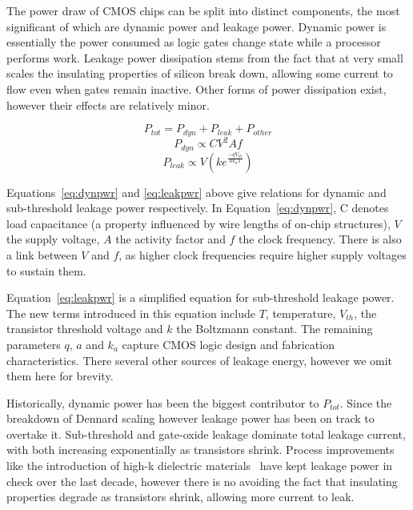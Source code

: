 The power draw of CMOS chips can be split into distinct components, the most significant of which are dynamic power and leakage power. Dynamic power is essentially the power consumed as logic gates change state while a processor performs work. Leakage power dissipation stems from the fact that at very small scales the insulating properties of silicon break down, allowing some current to flow even when gates remain inactive. Other forms of power dissipation exist, however their effects are relatively minor. \golden

\begin{equation}
\label{eq:totpwr}
P_{tot} = P_{dyn} + P_{leak} + P_{other}
\end{equation}
\begin{equation} 
\label{eq:dynpwr}
P_{dyn} \propto CV^{2}Af
\end{equation}
\begin{equation}
\label{eq:leakpwr}
P_{leak} \propto V\left(ke^{\frac{-qV_{th}}{ak_{a}T}}\right)
\end{equation}

Equations~\ref{eq:dynpwr} and \ref{eq:leakpwr} above give relations for dynamic and sub-threshold leakage power respectively. In Equation~\ref{eq:dynpwr}, C denotes load capacitance (a property influenced by wire lengths of on-chip structures), $V$ the supply voltage, $A$ the activity factor and $f$ the clock frequency. There is also a link between $V$ and $f$, as higher clock frequencies require higher supply voltages to sustain them. \golden

Equation~\ref{eq:leakpwr} is a simplified equation for sub-threshold leakage power. The new terms introduced in this equation include $T$, temperature, $V_{th}$, the transistor threshold voltage and $k$ the Boltzmann constant. The remaining parameters $q$, $a$ and $k_{a}$ capture CMOS logic design and fabrication characteristics. There several other sources of leakage energy, however we omit them here for brevity.\golden

Historically, dynamic power has been the biggest contributor to $P_{tot}$. Since the breakdown of Dennard scaling however leakage power has been on track to overtake it.  Sub-threshold and gate-oxide leakage dominate total leakage current, with both increasing exponentially as transistors shrink. Process improvements like the introduction of high-k dielectric materials~\cite{jan:2009aa} have kept leakage power in check over the last decade, however there is no avoiding the fact that insulating properties degrade as transistors shrink, allowing more current to leak. \golden

